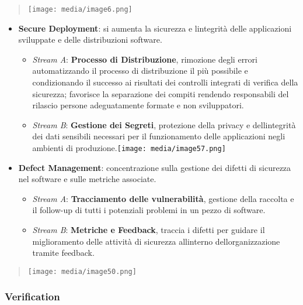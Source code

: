 \begin{quote}
\texttt{[image: media/image6.png]}
\end{quote}

\begin{itemize}
\item
  \textbf{Secure Deployment}: si aumenta la sicurezza e
  l\textquotesingle integrità delle applicazioni sviluppate e delle
  distribuzioni software.

  \begin{itemize}
  \item
    \emph{Stream A}: \textbf{Processo di Distribuzione}, rimozione degli
    errori automatizzando il processo di distribuzione il più possibile
    e condizionando il successo ai risultati dei controlli integrati di
    verifica della sicurezza; favorisce la separazione dei compiti
    rendendo responsabili del rilascio persone adeguatamente formate e
    non sviluppatori.
  \item
    \emph{Stream B}: \textbf{Gestione dei Segreti}, protezione della
    privacy e dell\textquotesingle integrità dei dati sensibili
    necessari per il funzionamento delle applicazioni negli ambienti di
    produzione.\texttt{[image: media/image57.png]}
  \end{itemize}
\item
  \textbf{Defect Management}: concentrazione sulla gestione dei difetti
  di sicurezza nel software e sulle metriche associate.

  \begin{itemize}
  \item
    \emph{Stream A}: \textbf{Tracciamento delle vulnerabilità}, gestione
    della raccolta e il follow-up di tutti i potenziali problemi in un
    pezzo di software.
  \item
    \emph{Stream B}: \textbf{Metriche e Feedback}, traccia i difetti per
    guidare il miglioramento delle attività di sicurezza
    all\textquotesingle interno dell\textquotesingle organizzazione
    tramite feedback.
  \end{itemize}
\end{itemize}

\begin{quote}
\texttt{[image: media/image50.png]}
\end{quote}

\subsubsection{Verification}\label{verification}

